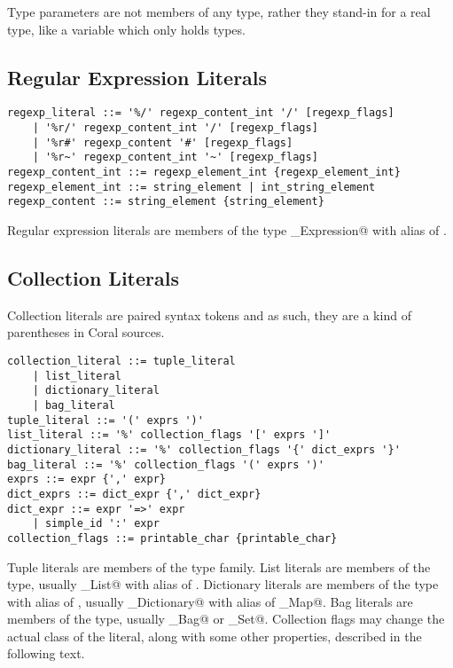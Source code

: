 Type parameters are not members of any type, rather they stand-in for a real type, like a variable which only holds types. 

\subsection{Regular Expression Literals}\label{sec:regexpliterals}

\syntax\begin{lstlisting}
regexp_literal ::= '%/' regexp_content_int '/' [regexp_flags]
	| '%r/' regexp_content_int '/' [regexp_flags]
	| '%r#' regexp_content '#' [regexp_flags]
	| '%r~' regexp_content_int '~' [regexp_flags]
regexp_content_int ::= regexp_element_int {regexp_element_int}
regexp_element_int ::= string_element | int_string_element
regexp_content ::= string_element {string_element}
\end{lstlisting}

Regular expression literals are members of the type \lstinline@Regular_Expression@ with alias of \lstinline@Regexp@. 

\subsection{Collection Literals}\label{sec:collectionliterals}

Collection literals are paired syntax tokens and as such, they are a kind of parentheses in Coral sources. 

\syntax\begin{lstlisting}
collection_literal ::= tuple_literal
	| list_literal
	| dictionary_literal
	| bag_literal
tuple_literal ::= '(' exprs ')'
list_literal ::= '%' collection_flags '[' exprs ']'
dictionary_literal ::= '%' collection_flags '{' dict_exprs '}'
bag_literal ::= '%' collection_flags '(' exprs ')'
exprs ::= expr {',' expr}
dict_exprs ::= dict_expr {',' dict_expr}
dict_expr ::= expr '=>' expr
	| simple_id ':' expr
collection_flags ::= printable_char {printable_char}
\end{lstlisting}

Tuple literals are members of the \lstinline@Tuple@ type family. List literals are members of the \lstinline@List@ type, usually \lstinline@Array_List@ with alias of \lstinline@Array@. Dictionary literals are members of the \lstinline@Dictionary@ type with alias of \lstinline@Map@, usually \lstinline@Hash_Dictionary@ with alias of \lstinline@Hash_Map@. Bag literals are members of the \lstinline@Bag@ type, usually \lstinline@Hash_Bag@ or \lstinline@Hash_Set@. Collection flags may change the actual class of the literal, along with some other properties, described in the following text. 


